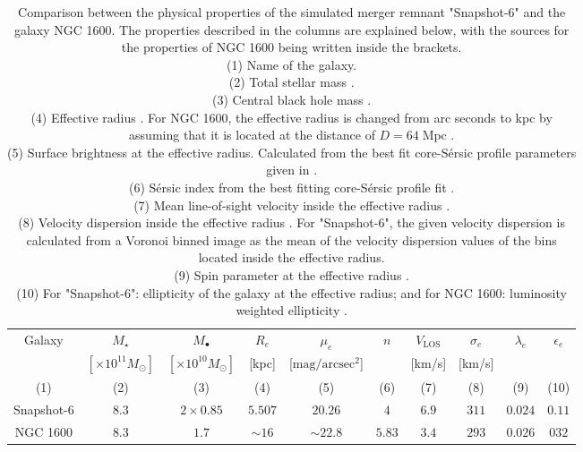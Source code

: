 \documentclass[english, oneside]{HYgradu}
\begin{document}
\begin{table}
	\begin{center}
		\scriptsize
		\begin{tabular}{c c c c c c c c c c}
		\hline
		\hline
		Galaxy & $M_\star$ & $M_\bullet$ & $R_e$ & $\mu_e$ & $n$ & 
		$V_\mathrm{LOS}$ & $\sigma_e$ & $\lambda_e$ &
		$\epsilon_e$ \\
		& $[\times 10^{11} M_\odot]$ & $[\times 10^{10} M_\odot]$ &
		[kpc] & [$\mathrm{mag/arcsec^2}$] & & [km/s] & [km/s] & & \\
		(1) & (2) & (3) & (4) & (5) & (6) & (7) & (8) & (9) & (10) \\
		\hline
		Snapshot-6 & $8.3$ & $2 \times 0.85$ & $5.507$ & $20.26$ & $4$ & $6.9$ & $311$ & $0.024$ & $0.11$ \\
		NGC 1600 & $8.3$ & $1.7$ & $\sim 16$ & $\sim 22.8$ & $5.83$ & $3.4$ & 
		$293$ & $0.026$ & $032$ \\
		\hline
		\end{tabular}
	\end{center}
	\caption{Comparison between the physical properties of the simulated merger remnant "Snapshot-6" and the galaxy NGC 1600. The properties described in the columns are explained below, with the sources for the properties of NGC 1600 being written inside the brackets. \\
	(1) Name of the galaxy. \\
	(2) Total stellar mass \citep{Thomas2016}. \\
	(3) Central black hole mass \citep{Thomas2016}. \\
	(4) Effective radius \citep{Thomas2016}. For NGC 1600, the effective radius is changed from arc seconds to kpc by assuming that it is located at the distance of $D = 64 \; \mathrm{Mpc}$ \citep{Thomas2016}. \\
	(5) Surface brightness at the effective radius. Calculated from the best fit core-Sérsic profile parameters given in \cite{Thomas2016}. \\
	(6) Sérsic index from the best fitting core-Sérsic profile fit \citep{Thomas2016}. \\
	(7) Mean line-of-sight velocity inside the effective radius \citep{Bender1994}. \\
	(8) Velocity dispersion inside the effective radius \citep{Veale2017veldisp}. For "Snapshot-6", the given velocity dispersion is calculated from a Voronoi binned image as the mean of the velocity dispersion values of the bins located inside the effective radius. \\
	(9) Spin parameter at the effective radius \citep{Veale2018lambda}. \\
	(10) For "Snapshot-6": ellipticity of the galaxy at the effective radius; and for NGC 1600: luminosity weighted ellipticity \citep{Goullaud2018}.
	}
	\label{table:snap6_vs_NGC1600}
\end{table}
\end{document}
